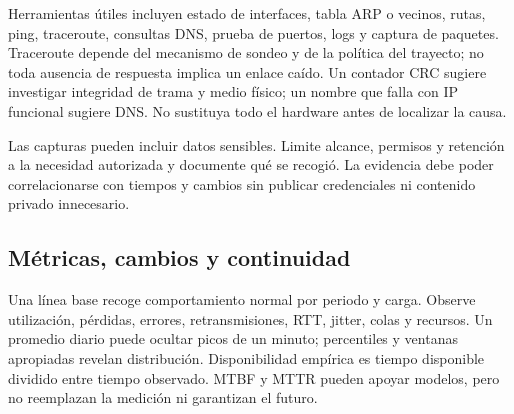 Herramientas útiles incluyen estado de interfaces, tabla ARP o vecinos, rutas, ping, traceroute, consultas DNS, prueba de puertos, logs y captura de paquetes. Traceroute depende del mecanismo de sondeo y de la política del trayecto; no toda ausencia de respuesta implica un enlace caído. Un contador CRC sugiere investigar integridad de trama y medio físico; un nombre que falla con IP funcional sugiere DNS. No sustituya todo el hardware antes de localizar la causa.

Las capturas pueden incluir datos sensibles. Limite alcance, permisos y retención a la necesidad autorizada y documente qué se recogió. La evidencia debe poder correlacionarse con tiempos y cambios sin publicar credenciales ni contenido privado innecesario.

\subsection{Métricas, cambios y continuidad}
Una línea base recoge comportamiento normal por periodo y carga. Observe utilización, pérdidas, errores, retransmisiones, RTT, jitter, colas y recursos. Un promedio diario puede ocultar picos de un minuto; percentiles y ventanas apropiadas revelan distribución. Disponibilidad empírica es tiempo disponible dividido entre tiempo observado. MTBF y MTTR pueden apoyar modelos, pero no reemplazan la medición ni garantizan el futuro.

